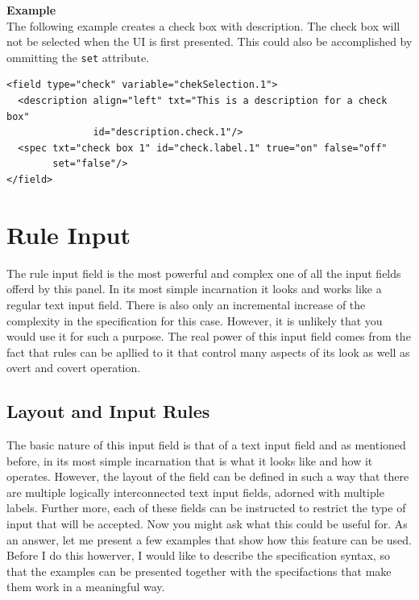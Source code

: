 \textbf{Example}\\

The following example creates a check box with description. The check
box will not be selected when the UI is first presented. This could also
be accomplished by ommitting the \texttt{set} attribute.\\

\footnotesize
\begin{verbatim}
<field type="check" variable="chekSelection.1">
  <description align="left" txt="This is a description for a check box"
               id="description.check.1"/>
  <spec txt="check box 1" id="check.label.1" true="on" false="off" 
        set="false"/>
</field>
\end{verbatim}
\normalsize

\section{Rule Input}

The rule input field is the most powerful and complex one of all the
input fields offerd by this panel. In its most simple incarnation it
looks and works like a regular text input field. There is also only an
incremental increase of the complexity in the specification for this
case. However, it is unlikely that you would use it for such a purpose.
The real power of this input field comes from the fact that rules can be
apllied to it that control many aspects of its look as well as overt and
covert operation.\\

\subsection{Layout and Input Rules}

The basic nature of this input field is that of a text input field and
as mentioned before, in its most simple incarnation that is what it
looks like and how it operates. However, the layout of the field can be
defined in such a way that there are multiple logically interconnected
text input fields, adorned with multiple labels. Further more, each of
these fields can be instructed to restrict the type of input that will
be accepted. Now you might ask what this could be useful for. As an
answer, let me present a few examples that show how this feature can be
used. Before I do this howerver, I would like to describe the
specification syntax, so that the examples can be presented together
with the specifactions that make them work in a meaningful way.\\

